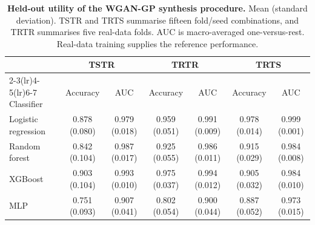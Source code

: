\begin{table}[htbp]
\centering\footnotesize
\caption{\textbf{Held-out utility of the WGAN-GP synthesis procedure.}
Mean (standard deviation). TSTR and TRTS summarise fifteen fold/seed
combinations, and TRTR summarises five real-data folds. AUC is macro-averaged
one-versus-rest. Real-data training supplies the reference performance.}
\label{tab:utility}
\setlength{\tabcolsep}{3pt}
\begin{tabular}{lcccccc}
\toprule
& \multicolumn{2}{c}{TSTR} & \multicolumn{2}{c}{TRTR} & \multicolumn{2}{c}{TRTS}\\
\cmidrule(lr){2-3}\cmidrule(lr){4-5}\cmidrule(lr){6-7}
Classifier & Accuracy & AUC & Accuracy & AUC & Accuracy & AUC\\
\midrule
Logistic regression & 0.878 (0.080) & 0.979 (0.018) & 0.959 (0.051) & 0.991 (0.009) & 0.978 (0.014) & 0.999 (0.001)\\
Random forest & 0.842 (0.104) & 0.987 (0.017) & 0.925 (0.055) & 0.986 (0.011) & 0.915 (0.029) & 0.984 (0.008)\\
XGBoost & 0.903 (0.104) & 0.993 (0.010) & 0.975 (0.037) & 0.994 (0.012) & 0.905 (0.032) & 0.984 (0.010)\\
MLP & 0.751 (0.093) & 0.907 (0.041) & 0.802 (0.054) & 0.900 (0.044) & 0.887 (0.052) & 0.973 (0.015)\\
\bottomrule\end{tabular}\end{table}
